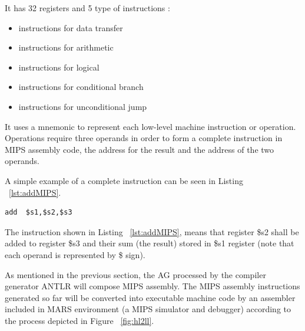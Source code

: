 \documentclass[
  oneside,
  11pt, a4paper,
  footinclude=true,
  headinclude=true,
  cleardoublepage=empty
]{scrbook}
\begin{document}

\newpage

It has 32 registers and 5 type of instructions :

\begin{itemize}
  \item instructions for data transfer
  \item instructions for arithmetic
  \item instructions for logical
  \item instructions for conditional branch
  \item instructions for unconditional jump

\end{itemize}


It uses a mnemonic to represent each low-level machine instruction or operation.
Operations require three operands in order to form a complete instruction in MIPS assembly code, the address for the result and the address of the two operands.

A simple example of a complete instruction can be seen in Listing ~\ref{lst:addMIPS}.

\begin{lstlisting}[caption={Sum of two registers in MIPS assembly code},label={lst:addMIPS}]
  add  $s1,$s2,$s3
\end{lstlisting}

The instruction shown in Listing ~\ref{lst:addMIPS}, means that register \$s2 shall be added to register \$s3 and their sum (the result) stored in \$s1 register (note that each operand is represented by \$ sign).

As mentioned in the previous section, the AG processed by the compiler generator ANTLR will compose MIPS assembly. The MIPS assembly instructions generated so far will be converted into executable machine code by an assembler included in MARS environment (a MIPS simulator and debugger) according to the process depicted in Figure ~\ref{fig:hl2ll}.
\end{document}
